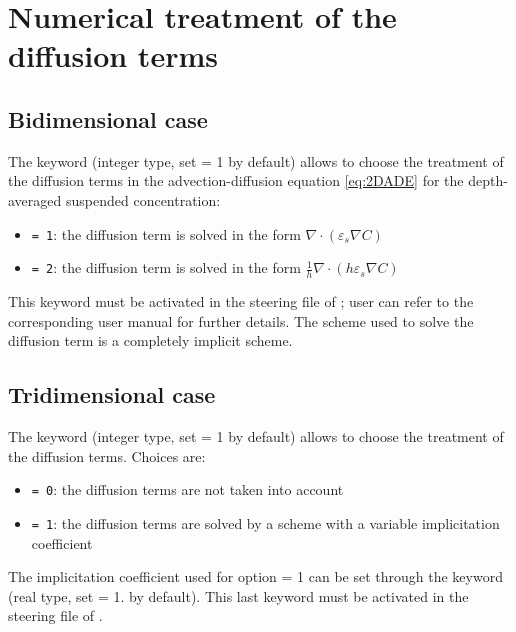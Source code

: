 \section{Numerical treatment of the diffusion terms}
\subsection{Bidimensional case}
The keyword  (integer type, set {\ttfamily = 1} by default) allows to choose the treatment of the diffusion terms in the advection-diffusion equation \ref{eq:2DADE} for the depth-averaged suspended concentration:
\begin{itemize}
\item \texttt{= 1}: the diffusion term is solved in the form $\nabla\cdot(\varepsilon_s\nabla C)$
\item \texttt{= 2}: the diffusion term is solved in the form $\frac{1}{h}\nabla\cdot(h\varepsilon_s\nabla C)$
\end{itemize}
This keyword must be activated in the steering file of ; user can refer to the corresponding user manual for further details.
The scheme used to solve the diffusion term is a completely implicit scheme.
\subsection{Tridimensional case}
The keyword  (integer type, set {\ttfamily = 1} by default) allows to choose the treatment of the diffusion terms. Choices are:
\begin{itemize}
\item \texttt{= 0}: the diffusion terms are not taken into account
\item \texttt{= 1}: the diffusion terms are solved by a scheme with a variable implicitation coefficient
\end{itemize}
The implicitation coefficient used for option {\ttfamily = 1} can be set through
the keyword  (real type, set {\ttfamily = 1.}
by default). This last keyword must be activated in the steering file of
.
